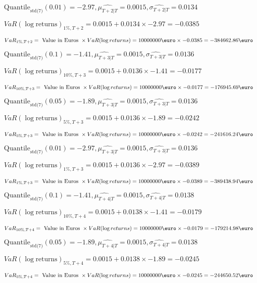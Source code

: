 $\text{Quantile}_\text{std(7)}(0.01) = -2.97,\hat{\mu_{T+2|T}} = 0.0015, \hat{\sigma_{T+2|T}} = 0.0134$

$VaR(\log \text{returns})_{1\%, T + 2} = 0.0015 + 0.0134\times-2.97 = -0.0385$

$VaR_{1\%, T + 2} = \text{ Value in Euros } \times VaR(\log returns) = 10 000 000 \text{\euro} \times-0.0385 = -384662.86 \text{\euro}$


$\text{Quantile}_\text{std(7)}(0.1) = -1.41,\hat{\mu_{T+3|T}} = 0.0015, \hat{\sigma_{T+3|T}} = 0.0136$

$VaR(\log \text{returns})_{10\%, T + 3} = 0.0015 + 0.0136\times-1.41 = -0.0177$

$VaR_{10\%, T + 3} = \text{ Value in Euros } \times VaR(\log returns) = 10 000 000 \text{\euro} \times-0.0177 = -176945.69 \text{\euro}$


$\text{Quantile}_\text{std(7)}(0.05) = -1.89,\hat{\mu_{T+3|T}} = 0.0015, \hat{\sigma_{T+3|T}} = 0.0136$

$VaR(\log \text{returns})_{5\%, T + 3} = 0.0015 + 0.0136\times-1.89 = -0.0242$

$VaR_{5\%, T + 3} = \text{ Value in Euros } \times VaR(\log returns) = 10 000 000 \text{\euro} \times-0.0242 = -241616.24 \text{\euro}$


$\text{Quantile}_\text{std(7)}(0.01) = -2.97,\hat{\mu_{T+3|T}} = 0.0015, \hat{\sigma_{T+3|T}} = 0.0136$

$VaR(\log \text{returns})_{1\%, T + 3} = 0.0015 + 0.0136\times-2.97 = -0.0389$

$VaR_{1\%, T + 3} = \text{ Value in Euros } \times VaR(\log returns) = 10 000 000 \text{\euro} \times-0.0389 = -389438.94 \text{\euro}$


$\text{Quantile}_\text{std(7)}(0.1) = -1.41,\hat{\mu_{T+4|T}} = 0.0015, \hat{\sigma_{T+4|T}} = 0.0138$

$VaR(\log \text{returns})_{10\%, T + 4} = 0.0015 + 0.0138\times-1.41 = -0.0179$

$VaR_{10\%, T + 4} = \text{ Value in Euros } \times VaR(\log returns) = 10 000 000 \text{\euro} \times-0.0179 = -179214.98 \text{\euro}$


$\text{Quantile}_\text{std(7)}(0.05) = -1.89,\hat{\mu_{T+4|T}} = 0.0015, \hat{\sigma_{T+4|T}} = 0.0138$

$VaR(\log \text{returns})_{5\%, T + 4} = 0.0015 + 0.0138\times-1.89 = -0.0245$

$VaR_{5\%, T + 4} = \text{ Value in Euros } \times VaR(\log returns) = 10 000 000 \text{\euro} \times-0.0245 = -244650.52 \text{\euro}$


